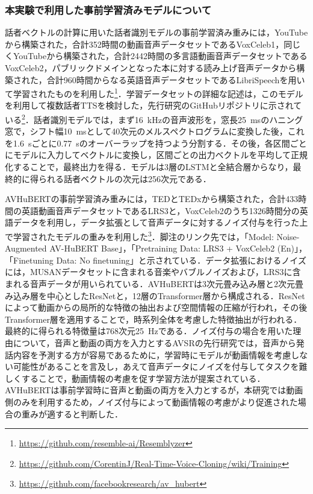 \subsubsection{本実験で利用した事前学習済みモデルについて}
話者ベクトルの計算に用いた話者識別モデルの事前学習済み重みには，YouTubeから構築された，合計352時間の動画音声データセットであるVoxCeleb1\cite{nagrani2020voxceleb}，同じくYouTubeから構築された，合計2442時間の多言語動画音声データセットであるVoxCeleb2，パブリックドメインとなった本に対する読み上げ音声データから構築された，合計960時間からなる英語音声データセットであるLibriSpeech\cite{panayotov2015librispeech}を用いて学習されたものを利用した\footnote{\url{https://github.com/resemble-ai/Resemblyzer}}．学習データセットの詳細な記述は，このモデルを利用して複数話者TTSを検討した，先行研究\cite{jia2018transfer}のGitHubリポジトリに示されている\footnote{\url{https://github.com/CorentinJ/Real-Time-Voice-Cloning/wiki/Training}}．話者識別モデルでは，まず\SI{16}{\kHz}の音声波形を，窓長\SI{25}{\ms}のハニング窓で，シフト幅\SI{10}{\ms}として40次元のメルスペクトログラムに変換した後，これを\SI{1.6}{\s}ごとに\SI{0.77}{\s}のオーバーラップを持つよう分割する．その後，各区間ごとにモデルに入力してベクトルに変換し，区間ごとの出力ベクトルを平均して正規化することで，最終出力を得る．モデルは3層のLSTMと全結合層からなり，最終的に得られる話者ベクトルの次元は256次元である．

AVHuBERTの事前学習済み重みには，TEDとTEDxから構築された，合計433時間の英語動画音声データセットであるLRS3と，VoxCeleb2のうち1326時間分の英語データを利用し，データ拡張として音声データに対するノイズ付与を行った上で学習されたモデル\cite{shi2022robust}の重みを利用した\footnote{\url{https://github.com/facebookresearch/av_hubert}}．脚注のリンク先では，「Model: Noise-Augmented AV-HuBERT Base」，「Pretraining Data: LRS3 + VoxCeleb2 (En)」，「Finetuning Data: No finetuning」と示されている．データ拡張におけるノイズには，MUSANデータセット\cite{snyder2015musan}に含まれる音楽やバブルノイズおよび，LRS3に含まれる音声データが用いられている．AVHuBERTは3次元畳み込み層と2次元畳み込み層を中心としたResNetと，12層のTransformer層から構成される．ResNetによって動画からの局所的な特徴の抽出および空間情報の圧縮が行われ，その後Transformer層を適用することで，時系列全体を考慮した特徴抽出が行われる．最終的に得られる特徴量は768次元\SI{25}{\Hz}である．ノイズ付与の場合を用いた理由について，音声と動画の両方を入力とするAVSRの先行研究\cite{afouras2018deep}では，音声から発話内容を予測する方が容易であるために，学習時にモデルが動画情報を考慮しない可能性があることを言及し，あえて音声データにノイズを付与してタスクを難しくすることで，動画情報の考慮を促す学習方法が提案されている．AVHuBERTは事前学習時に音声と動画の両方を入力とするが，本研究では動画側のみを利用するため，ノイズ付与によって動画情報の考慮がより促進された場合の重みが適すると判断した．

